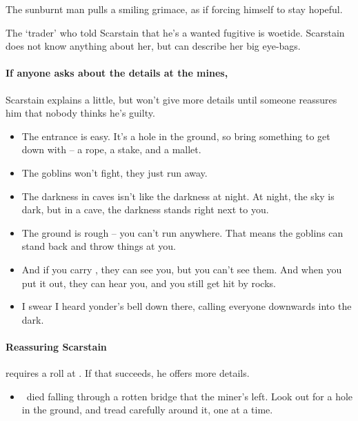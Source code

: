 \begin{multicols}{2}
\begin{boxtext}
  The sunburnt man pulls a smiling grimace, as if forcing himself to stay hopeful.
\end{boxtext}

The `trader' who told Scarstain that he's a wanted fugitive is \gls{woetide}.
Scarstain does not know anything about her, but can describe her big eye-bags.

\paragraph{If anyone asks about the details at the mines,}
Scarstain explains a little, but won't give more details until someone reassures him that nobody thinks he's guilty.

\begin{speechtext}
  \begin{itemize}
    \item
    The entrance is easy.
    It's a hole in the ground, so bring something to get down with -- a rope, a stake, and a mallet.
    \item
    The goblins won't fight, they just run away.
    \item
    The darkness in caves isn't like the darkness at night.
    At night, the sky is dark, but in a cave, the darkness stands right next to you.
    \item
    The ground is rough -- you can't run anywhere.
    That means the goblins can stand back and throw things at you.
    \item
    And if you carry , they can see you, but you can't see them.
    And when you put it out, they can hear you, and you still get hit by rocks.
    \item
    I swear I heard \gls{yonder}'s bell down there, calling everyone downwards into the dark.
  \end{itemize}
\end{speechtext}

\paragraph{Reassuring Scarstain}
requires a  roll at \tn[10].
If that succeeds, he offers more details.

\begin{speechtext}
  \begin{itemize}
    \item
    \composeHumanName\ died falling through a rotten bridge that the miner's left.
    Look out for a hole in the ground, and tread carefully around it, one at a time.
    

\end{itemize}
\end{speechtext}
\end{multicols}
